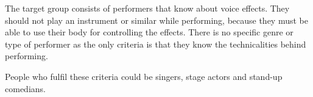 The target group consists of performers that know about voice effects. They should not play an instrument or similar while performing, because they must be able to use their body for controlling the effects. There is no specific genre or type of performer as the only criteria is that they know the technicalities behind performing.

People who fulfil these criteria could be singers, stage actors and stand-up comedians.